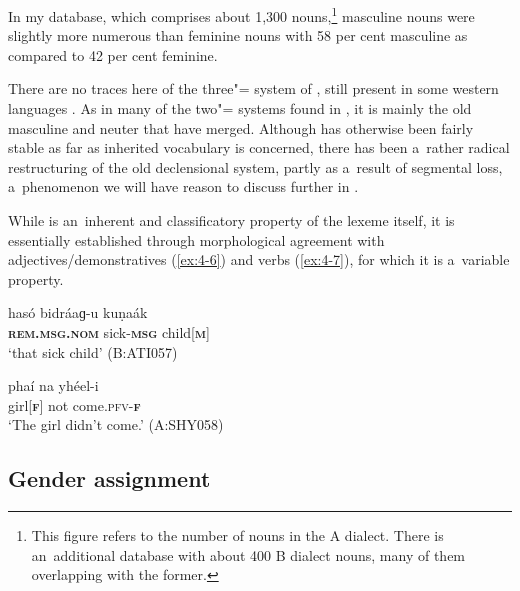 In my database, which comprises about 1,300 nouns,\footnote{This figure refers to the number of nouns in the A dialect. There is an~additional database with about 400 B dialect nouns, many of them overlapping with the former.} masculine nouns were slightly more numerous than feminine nouns with 58 per cent masculine as compared to 42 per cent feminine.


There are no traces here of the three"= system of \iliOIA, still present in some western \iliNIA languages \citep[220--221]{masica1991}. As in many of the two"= systems found in \iliNIA, it is mainly the old masculine and neuter that have merged. Although  has otherwise been fairly stable as far as inherited vocabulary is concerned, there has been a~rather radical restructuring of the old declensional system, partly as a~result of segmental loss, a~phenomenon we will have reason to discuss further in .


While  is an~inherent and classificatory property of the  lexeme itself, it is essentially established through morphological agreement with adjectives/demonstratives (\ref{ex:4-6}) and verbs (\ref{ex:4-7}), for which it is a~variable property. 


\begin{exe}
\ex
\label{ex:4-6}
\gll hasó bidráaɡ-u kuṇaák \\
	\textbf{\textsc{rem.msg.nom}} sick-\textbf{\textsc{msg}} child[\textbf{\textsc{m}}] \\
\glt `that sick child' (B:ATI057)
\end{exe}

\begin{exe}
\ex
\label{ex:4-7}
\gll phaí na yhéel-i \\
	girl[\textbf{\textsc{f}}] not come.\textsc{pfv-\textbf{\textsc{f}}} \\
\glt `The girl didn't come.' (A:SHY058)
\end{exe}

\subsection{Gender assignment}
\label{subsec:4-3-1}


